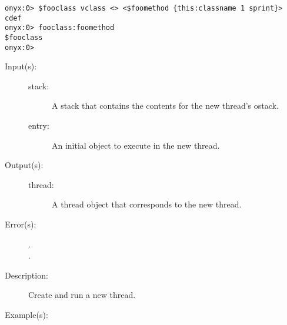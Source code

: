 \begin{description}
\begin{description}
\begin{verbatim}
onyx:0> $fooclass vclass <> <$foomethod {this:classname 1 sprint}> cdef
onyx:0> fooclass:foomethod
$fooclass
onyx:0>
		\end{verbatim}
	\end{description}
\label{systemdict:thread}
\item[{\onyxop{stack entry}{thread}{thread}}: ]
	\begin{description}\item[]
	\item[Input(s): ]
		\begin{description}\item[]
		\item[stack: ]
			A stack that contains the contents for the new thread's
			ostack.
		\item[entry: ]
			An initial object to execute in the new thread.
		\end{description}
	\item[Output(s): ]
		\begin{description}\item[]
		\item[thread: ]
			A thread object that corresponds to the new thread.
		\end{description}
	\item[Error(s): ]
		\begin{description}\item[]
		\item[.]
		\item[.]
		\end{description}
	\item[Description: ]
		Create and run a new thread.
	\item[Example(s): ]\begin{verbatim}


\end{verbatim}
\end{description}
\end{description}
